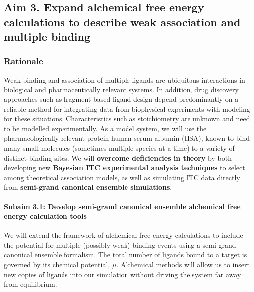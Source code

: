 \documentclass[10pt,final]{article}
\newcommand{\subsubsubsection}[1]{\paragraph*{#1}}
\begin{document}
\subsection*{Aim 3. Expand alchemical free energy calculations to describe weak association and multiple binding}
\subsubsection*{Rationale}
Weak binding and association of multiple ligands are ubiquitous interactions in biological and pharmaceutically relevant systems.
In addition, drug discovery approaches such as fragment-based ligand design depend predominantly on a reliable method for integrating data from biophysical experiments with modeling for these situations. Characteristics such as stoichiometry are unknown and need to be modelled experimentally.
As a model system, we will use the pharmacologically relevant protein human serum albumin (HSA), known to bind many small molecules (sometimes multiple species at a time) to a variety of distinct binding sites.
We will \textbf{overcome deficiencies in theory} by both developing new \textbf{Bayesian ITC experimental analysis techniques} to select among theoretical association models, as well as simulating ITC data directly from \textbf{semi-grand canonical ensemble simulations}.
\begin{center}
\end{center}

\subsubsubsection{Subaim 3.1: Develop semi-grand canonical ensemble alchemical free energy calculation tools}
We will extend the framework of alchemical free energy calculations to include the potential for multiple (possibly weak) binding events using a semi-grand canonical ensemble formalism. The total number of ligands bound to a target is governed by its chemical potential, $\mu$. Alchemical methods will allow us to insert new copies of ligands into our simulation without driving the system far away from equilibrium. 
\begin{center}
\end{center}
\end{document}
